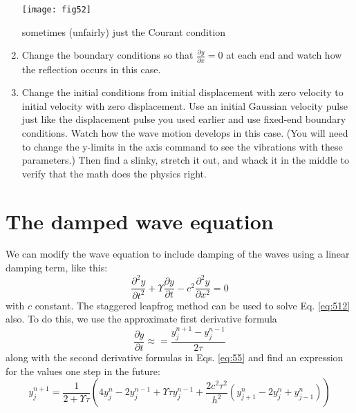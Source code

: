 \begin{enumerate}[label=(\alph*)]
\texttt{[image: fig52]}\label{fig:26}


sometimes (unfairly) just the Courant condition
\item Change the boundary conditions so that $ \frac{\partial y}{\partial x} = 0 $ at each end and watch
how the reflection occurs in this case.
\item Change the initial conditions from initial displacement with zero
velocity to initial velocity with zero displacement. Use an initial Gaussian velocity pulse just like the displacement pulse you used earlier
and use fixed-end boundary conditions. Watch how the wave motion
develops in this case. (You will need to change the y-limits in the axis
command to see the vibrations with these parameters.) Then find a
slinky, stretch it out, and whack it in the middle to verify that the math
does the physics right.

\end{enumerate}

\section*{The damped wave equation}
We can modify the wave equation to include damping of the waves using a linear
damping term, like this:
\begin{equation}\label{eq:512}
\frac{\partial^2 y}{\partial t^2} + \Upsilon \frac{\partial y}{\partial t} - c^2 \frac{\partial^2 y}{\partial x^2} = 0
\end{equation}
with $c$ constant. The staggered leapfrog method can be used to solve Eq. \eqref{eq:512}
also. To do this, we use the approximate first derivative formula
\begin{equation}\label{eq:513}
\frac{\partial y}{\partial t } \approx = \frac{y_j^{n+1} - y_j^{n-1}}{2 \tau}
\end{equation}
along with the second derivative formulas in Eqs. \eqref{eq:55} and find an expression for
the values one step in the future:
\begin{equation}\label{eq:514}
y^{n+1}_j = \frac{1}{2+ \Upsilon \tau}(4y^n_j-2y^{n-1}_j+ \Upsilon \tau y^{n-1}_j + \frac{2c^2 \tau^2}{h^2}(y^n_{j+1} - 2y^n_j + y^n_{j-1}))
\end{equation}
